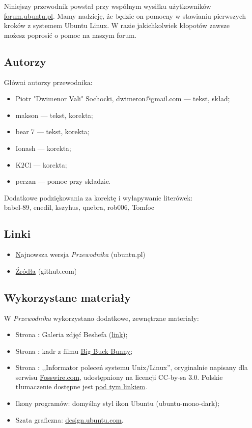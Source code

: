 Niniejszy przewodnik powstał przy wspólnym wysiłku użytkowników \href{http://ubuntu.pl/forum/}{forum.ubuntu.pl}. Mamy nadzieję, że będzie on pomocny w stawianiu pierwszych kroków z systemem Ubuntu Linux. W razie jakichkolwiek kłopotów zawsze możesz poprosić o pomoc na naszym forum.

\subsection{Autorzy}
Główni autorzy przewodnika:
\begin{itemize}
\item Piotr "Dwimenor Vali" Sochocki, dwimeron@gmail.com --- tekst, skład;
\item makson --- tekst, korekta;
\item bear 7 --- tekst, korekta;
\item Ionash --- korekta;
\item K2Cl --- korekta;
\item perzan --- pomoc przy składzie.
\end{itemize}

Dodatkowe podziękowania za korektę i wyłapywanie literówek:\\
babel-89, enedil, kszyhus, qnebra, rob006, Tomfoc

\subsection{Linki}
\begin{itemize}
\item \href{http://ubuntu.pl/dokumenty/Przewodnik_Ubuntu_14.04_LTS_Trusty_Tahr.pdf}Najnowsza wersja \textit{Przewodnika} (ubuntu.pl)
\item \href{https://github.com/Dwimenor/Przewodnik-Ubuntu-14.04-LTS-Trusty-Tahr}{Źródła} (github.com)
\end{itemize}

\subsection{Wykorzystane materiały}
W \textit{Przewodniku} wykorzystano dodatkowe, zewnętrzne materiały:
\begin{itemize}
\item Strona \pageref{shotwell}: Galeria zdjęć Beshefa (\href{https://www.flickr.com/photos/sharif/sets/72157600223985436/}{link});
\item Strona \pageref{totem}: kadr z filmu \href{http://www.bigbuckbunny.org}{Big Buck Bunny};
\item Strona \pageref{polecenia}: ,,Informator poleceń systemu Unix/Linux'', oryginalnie napisany dla serwisu \href{http://fosswire.com/}{Fosswire.com}, udostępniony na licencji CC-by-sa 3.0. Polskie tłumaczenie dostępne jest \href{http://czytelnia.ubuntu.pl/index.php/2012/02/24/wydrukuj-i-powies-kolo-monitora-informator-polecen-systemu-unixlinux/}{pod tym linkiem}.
\item Ikony programów: domyślny styl ikon Ubuntu (ubuntu-mono-dark);
\item Szata graficzna: \href{http://design.ubuntu.com/}{design.ubuntu.com}.
\end{itemize}


